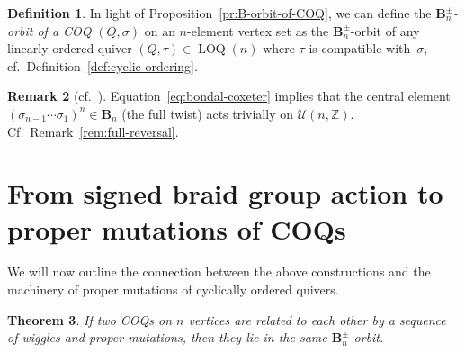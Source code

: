 \documentclass[11pt, letterpaper]{amsart}
\newtheorem{theorem}{Theorem}[section]
\theoremstyle{definition}
\newtheorem{remark}[theorem]{Remark}
\newtheorem{definition}[theorem]{Definition}
\numberwithin{equation}{section}
\def\ZZ{{\mathbb Z}}
\newcommand\LOQ{\operatorname{LOQ}}
\begin{document}
\begin{definition}
In light of Proposition~\ref{pr:B-orbit-of-COQ}, 
we can define the \emph{$\mathbf{B}_n^\pm$-orbit of a COQ} $(Q,\sigma)$ on an $n$-element vertex set
as the $\mathbf{B}_n^\pm$-orbit of any linearly ordered quiver $(Q,\tau)\in\LOQ(n)$ 
where $\tau$ is compatible with~$\sigma$, cf.\ Definition~\ref{def:cyclic ordering}. 

\end{definition}

\begin{remark}[{cf.\ \cite[Remark~2.3]{Bondal}}]
\label{rem:double-twist}
Equation~\eqref{eq:bondal-coxeter} implies that the central element $(\sigma_{n-1} \cdots  \sigma_1)^n\in\mathbf{B}_n$
(the full twist) acts trivially on $\mathcal{U}(n,\ZZ)$. 
Cf.\ Remark~\ref{rem:full-reversal}. 
\end{remark}

\section{From signed braid group action to proper mutations of COQs}
\label{sec:bondal-to-proper-mut}

We will now outline the connection between the above constructions
and the machinery of proper mutations of cyclically ordered quivers. 

\begin{theorem}
\label{th:braid-vs-COQ-mut}
If two COQs on $n$ vertices are related to each other 
by a sequence of wiggles and proper mutations, 
then they lie in the same $\mathbf{B}_n^\pm$-orbit. 
\end{theorem}
\end{document}
